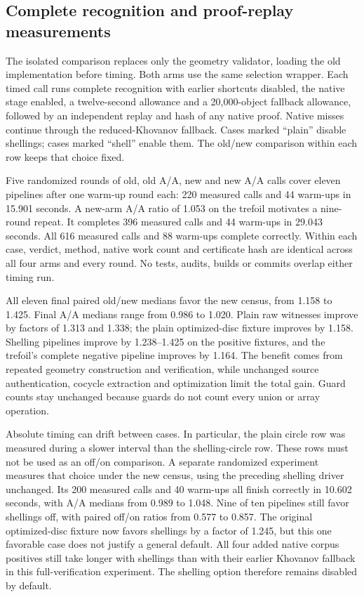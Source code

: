 \subsection{Complete recognition and proof-replay measurements}

The isolated comparison replaces only the geometry validator, loading the
old implementation before timing. Both arms use the same selection wrapper.
Each timed call runs complete recognition with earlier shortcuts disabled,
the native stage enabled, a twelve-second allowance and a 20,000-object
fallback allowance, followed by an independent replay and hash of any native
proof. Native misses continue through the reduced-Khovanov fallback. Cases
marked ``plain'' disable shellings; cases marked ``shell'' enable them. The
old/new comparison within each row keeps that choice fixed.

Five randomized rounds of old, old A/A, new and new A/A calls cover eleven
pipelines after one warm-up round each: 220 measured calls and 44 warm-ups
in 15.901 seconds. A new-arm A/A ratio of 1.053 on the trefoil motivates a
nine-round repeat. It completes 396 measured calls and 44 warm-ups in
29.043 seconds. All 616 measured calls and 88 warm-ups complete correctly.
Within each case, verdict, method, native work count and certificate hash
are identical across all four arms and every round. No tests, audits, builds
or commits overlap either timing run.
\begin{center}
\small

\end{center}
All eleven final paired old/new medians favor the new census, from 1.158 to
1.425. Final A/A medians range from 0.986 to 1.020. Plain raw witnesses improve
by factors of 1.313 and 1.338; the plain optimized-disc fixture improves by
1.158. Shelling pipelines improve by 1.238--1.425 on the positive fixtures,
and the trefoil's complete negative pipeline improves by 1.164. The benefit
comes from repeated geometry construction and verification, while unchanged
source authentication, cocycle extraction and optimization limit the total
gain. Guard counts stay unchanged because guards do not count every union or
array operation.

Absolute timing can drift between cases. In particular, the plain circle
row was measured during a slower interval than the shelling-circle row.
These rows must not be used as an off/on comparison. A separate randomized
experiment measures that choice under the new census, using the preceding
shelling driver unchanged. Its 200 measured calls and 40 warm-ups all finish
correctly in 10.602 seconds, with A/A medians from 0.989 to 1.048. Nine of ten
pipelines still favor shellings off, with paired off/on ratios from 0.577 to
0.857. The original optimized-disc fixture now favors shellings by a factor
of 1.245, but this one favorable case does not justify a general default.
All four added native corpus positives still take longer with shellings than
with their earlier Khovanov fallback in this full-verification experiment.
The shelling option therefore remains disabled by default.

